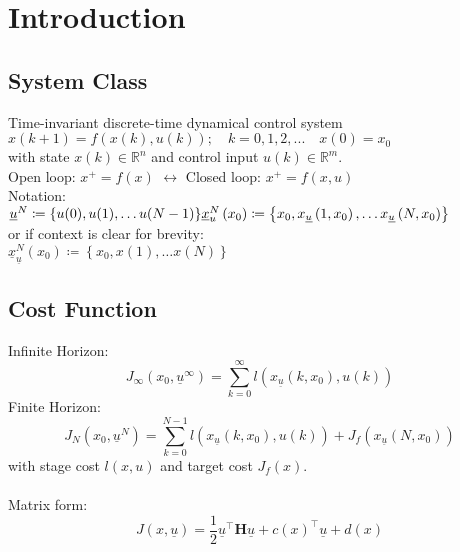\documentclass[english]{latex4ei/latex4ei_sheet}
\begin{document}
\section{Introduction}
\begin{sectionbox}

\subsection{System Class}
Time-invariant discrete-time dynamical control system \\
$x(k+1)=f(x(k), u(k));\quad k=0,1,2,...\quad x(0)=x_0$\\
with state $x(k)\in\mathbb{R}^n$ and control input $u(k)\in\mathbb{R}^m$.\\
Open loop: $x^{+}=f(x)$ \; $\longleftrightarrow$ \; Closed loop: $x^{+}=f(x,u)$\\

Notation:\\
${\underline{u}^{N}\coloneqq\{u(0), u(1), \ldots u(N-1)\}} \\ {\underline{x}_{u}^{N}\left(x_{0}\right)\coloneqq\left\{x_{0}, x_{\underline{u}}\left(1, x_{0}\right), \ldots x_{\underline{u}}\left(N, x_{0}\right)\right\}}$ \\ 
or if context is clear for brevity: \\ ${\underline{x}_{\underline{u}}^{N}\left(x_{0}\right)\coloneqq\left\{x_{0}, x(1), \ldots x(N)\right\}}$\\

\subsection{Cost Function}
Infinite Horizon:
\[J_{\infty}\left(x_{0}, \underline{u}^{\infty}\right)=\sum_{k=0}^{\infty} l\left(x_{\underline{u}}\left(k, x_{0}\right), u(k)\right)\]
Finite Horizon:
\[J_{N}\left(x_{0}, \underline{u}^{N}\right)=\sum_{k=0}^{N-1} l\left(x_{\underline{u}}\left(k, x_{0}\right), u(k)\right)+J_{f}\left(x_{\underline{u}}\left(N, x_{0}\right)\right)\]
with stage cost $l(x,u)$ and target cost $J_f(x)$.\\
\\
Matrix form:
\[J(x,\underline{u})=\frac{1}{2}\underline{u}^{\top}\mathbf{H}\underline{u}+c(x)^{\top}\underline{u}+d(x)\]

\end{sectionbox}
\end{document}
